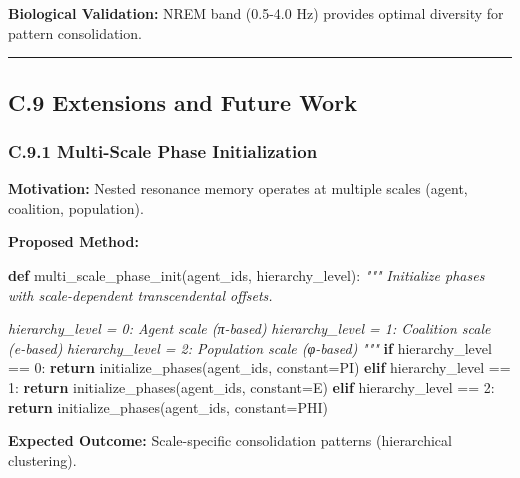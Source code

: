 \documentclass[
]{article}
\newenvironment{Shaded}{}{}
\newcommand{\CommentTok}[1]{\textcolor[rgb]{0.38,0.63,0.69}{\textit{#1}}}
\newcommand{\ControlFlowTok}[1]{\textcolor[rgb]{0.00,0.44,0.13}{\textbf{#1}}}
\newcommand{\DecValTok}[1]{\textcolor[rgb]{0.25,0.63,0.44}{#1}}
\newcommand{\KeywordTok}[1]{\textcolor[rgb]{0.00,0.44,0.13}{\textbf{#1}}}
\newcommand{\NormalTok}[1]{#1}
\newcommand{\OperatorTok}[1]{\textcolor[rgb]{0.40,0.40,0.40}{#1}}
\begin{document}
\textbf{Biological Validation:} NREM band (0.5-4.0 Hz) provides optimal
diversity for pattern consolidation.

\begin{center}\rule{0.5\linewidth}{0.5pt}\end{center}

\subsection{C.9 Extensions and Future
Work}\label{c.9-extensions-and-future-work}

\subsubsection{C.9.1 Multi-Scale Phase
Initialization}\label{c.9.1-multi-scale-phase-initialization}

\textbf{Motivation:} Nested resonance memory operates at multiple scales
(agent, coalition, population).

\textbf{Proposed Method:}

\begin{Shaded}
\begin{Highlighting}[]
\KeywordTok{def}\NormalTok{ multi\_scale\_phase\_init(agent\_ids, hierarchy\_level):}
    \CommentTok{"""}
\CommentTok{    Initialize phases with scale{-}dependent transcendental offsets.}

\CommentTok{    hierarchy\_level = 0: Agent scale (π{-}based)}
\CommentTok{    hierarchy\_level = 1: Coalition scale (e{-}based)}
\CommentTok{    hierarchy\_level = 2: Population scale (φ{-}based)}
\CommentTok{    """}
    \ControlFlowTok{if}\NormalTok{ hierarchy\_level }\OperatorTok{==} \DecValTok{0}\NormalTok{:}
        \ControlFlowTok{return}\NormalTok{ initialize\_phases(agent\_ids, constant}\OperatorTok{=}\NormalTok{PI)}
    \ControlFlowTok{elif}\NormalTok{ hierarchy\_level }\OperatorTok{==} \DecValTok{1}\NormalTok{:}
        \ControlFlowTok{return}\NormalTok{ initialize\_phases(agent\_ids, constant}\OperatorTok{=}\NormalTok{E)}
    \ControlFlowTok{elif}\NormalTok{ hierarchy\_level }\OperatorTok{==} \DecValTok{2}\NormalTok{:}
        \ControlFlowTok{return}\NormalTok{ initialize\_phases(agent\_ids, constant}\OperatorTok{=}\NormalTok{PHI)}
\end{Highlighting}
\end{Shaded}

\textbf{Expected Outcome:} Scale-specific consolidation patterns
(hierarchical clustering).
\end{document}
